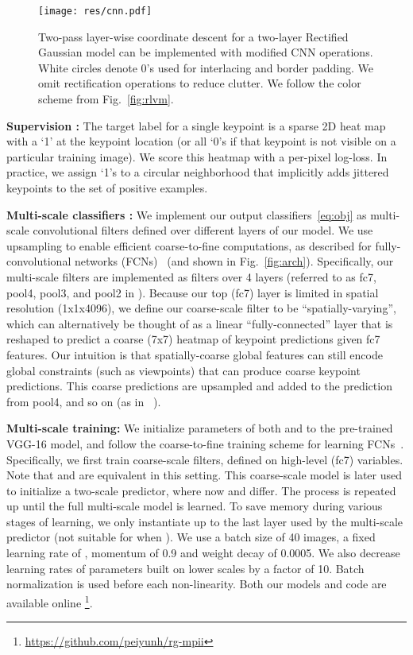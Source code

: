 \documentclass[10pt,twocolumn,letterpaper]{article}
\newcommand{\QP}[1]{{}}
\begin{document}
\begin{figure}[t!]
  \centering
  \texttt{[image: res/cnn.pdf]}
\caption{Two-pass layer-wise coordinate descent for a two-layer Rectified Gaussian
    model can be implemented with modified CNN operations. White
    circles denote 0's used for interlacing and border padding. We
    omit rectification operations to reduce clutter. We follow the
    color scheme from Fig.~\ref{fig:rlvm}. }
  \label{fig:cnn}
\end{figure}

{\bf Supervision :} The target label for a single keypoint is a
sparse 2D heat map with a `1' at the keypoint location (or all `0's if
that keypoint is not visible on a particular training image). We score
this heatmap with a per-pixel log-loss. In practice, we assign `1's to
a circular neighborhood that implicitly adds jittered keypoints to the
set of positive examples. 


{\bf Multi-scale classifiers :} We implement our output
classifiers~\eqref{eq:obj} as multi-scale convolutional filters
defined over different layers of our model. We use upsampling to
enable efficient coarse-to-fine computations, as described for
fully-convolutional networks (FCNs)~\cite{long2014fully} (and shown in
Fig.~\ref{fig:arch}). Specifically, our multi-scale filters are
implemented as  filters over 4 layers (referred to as fc7, pool4,
pool3, and pool2 in \cite{simonyan2014very}). Because our top (fc7)
layer is limited in spatial resolution (1x1x4096), we define our
coarse-scale filter to be ``spatially-varying'', which can
alternatively be thought of as a linear ``fully-connected'' layer that
is reshaped to predict a coarse (7x7) heatmap of keypoint predictions
given fc7 features. Our intuition is that spatially-coarse global
features can still encode global constraints (such as viewpoints) that
can produce coarse keypoint predictions. This coarse predictions are
upsampled and added to the prediction from pool4, and so on (as in
~\cite{long2014fully}).


{\bf Multi-scale training:} We initialize parameters of both \QP{1}
and \QP{2} to the pre-trained VGG-16 model\cite{simonyan2014very}, and
follow the coarse-to-fine training scheme for learning
FCNs~\cite{long2014fully}. Specifically, we first train coarse-scale
filters, defined on high-level (fc7) variables.
Note that \QP{1} and \QP{2} are equivalent in this setting. This
coarse-scale model is later used to initialize a two-scale predictor,
where now \QP{1} and \QP{2} differ. 
The process is repeated up until the full multi-scale model is
learned. To save memory during various stages of learning, we only
instantiate \QP{2} up to the last layer used by the multi-scale
predictor (not suitable for \QP{k} when ). We use a batch size of
40 images, a fixed learning rate of , momentum of 0.9 and
weight decay of 0.0005. We also decrease learning rates of parameters
built on lower scales \cite{long2014fully} by a factor of 10. Batch
normalization\cite{ioffe2015batch} is used before each
non-linearity. Both our models and code are
available online \footnote{\url{https://github.com/peiyunh/rg-mpii}}.
\end{document}

